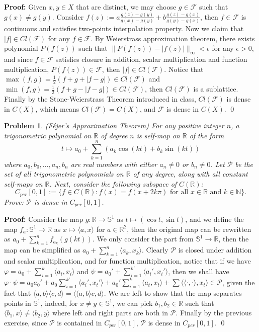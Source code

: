 \documentclass[12pt]{article}
\newtheorem{problem}{Problem}
\begin{document}
\textbf{Proof:} Given $x,y\in X$ that are distinct, we may choose $g\in\mathcal{F}$ such that $g(x)\neq g(y)$. Consider $f(z):=a\frac{g(z)-g(y)}{g(x)-g(y)}+b\frac{g(z)-g(x)}{g(y)-g(x)}$, then $f\in\mathcal{F}$ is continuous and satisfies two-points interpolation property. Now we claim that $|f|\in Cl(\mathcal{F})$ for any $f\in\mathcal{F}$. By Weierstrass approximation theorem, there exists polynomial $P(f(z))$ such that $\|P(f(z))-|f(z)|\|_\infty<\epsilon$ for any $\epsilon>0$, and since $f\in\mathcal{F}$ satisfies closure in addition, scalar multiplication and function multiplication, $P(f(z))\in\mathcal{F}$, then $|f|\in Cl(\mathcal{F})$. Notice that $\max(f,g)=\frac{1}{2}(f+g+|f-g|)\in Cl(\mathcal{F})$ and $\min(f, g)=\frac{1}{2}(f+g-|f-g|)\in Cl(\mathcal{F})$, then $Cl(\mathcal{F})$ is a sublattice. Finally by the Stone-Weierstrass Theorem introduced in class, $Cl(\mathcal{F})$ is dense in $C(X)$, which means $Cl(\mathcal{F})=C(X)$, and $\mathcal{F}$ is dense in $C(X)$. \qed
\\
\begin{problem}
(Féjer's Approximation Theorem) For any positive integer $n$, a trigonometric polynomial on $\mathbb{R}$ of degree $n$ is self-map on $\mathbb{R}$ of the form 
$$
t\mapsto a_0+\sum\limits_{k=1}^{n}(a_k\cos(kt)+b_k\sin(kt))
$$ where $a_0, b_0, \dots, a_n, b_n$ are real numbers with either $a_n\neq 0$ or $b_n\neq 0$. Let $\mathcal{P}$ be the set of all trigonometric polynomials on $\mathbb{R}$ of any degree, along with all constant self-maps on $\mathbb{R}$. Next, consider the following subspace of $C(\mathbb{R})$:
$$
C_{per}[0,1]:= \{f\in C(\mathbb{R}): f(x)=f(x+2k\pi)\text{ for all }x\in\mathbb{R}\text{ and }k\in\mathbb{N}\}.
$$ Prove: $\mathcal{P}$ is dense in $C_{per}[0,1]$.
\end{problem}
\textbf{Proof:} Consider the map $g:\mathbb{R}\to\mathbb{S}^1$ as $t\mapsto (\cos t, \sin t)$, and we define the map $f_a: \mathbb{S}^1\to\mathbb{R}$ as $x\mapsto\langle a, x\rangle$ for $a\in\mathbb{R}^2$, then the original map can be rewritten as $a_0+\sum\limits_{k=1}^{n}f_{a_k}(g(kt))$. We only consider the part from $\mathbb{S}^1\to\mathbb{R}$, then the map can be simplified as $a_0+\sum\limits_{k=1}^n\langle a_k, x_k\rangle$. Clearly $\mathcal{P}$ is closed under addition and scalar multiplication, and for function multiplication, notice that if we have $\varphi=a_0+\sum\limits_{i=1}^k\langle a_i, x_i\rangle$ and $\psi=a_0'+\sum\limits_{i=1}^{k'}\langle a_{i}', x_i'\rangle$, then we shall have $\varphi\cdot\psi=a_0a_0'+a_{0}\sum\limits_{i=1}^{k'}\langle a_i', x_t'\rangle + a_0'\sum\limits_{i=1}^{k}\langle a_t, x_t\rangle + \sum\limits\langle\langle\cdot, \cdot\rangle, x_t\rangle\in\mathcal{P}$, given the fact that $\langle a,b\rangle\langle c, d\rangle=\langle \langle a,b\rangle c, d\rangle$. We are left to show that the map separates points in $\mathbb{S}^1$, indeed, for $x\neq y\in\mathbb{S}^1$, we can pick $b_1, b_2\in\mathbb{R}$ such that $\langle b_1, x\rangle\neq \langle b_2, y\rangle$ where left and right parts are both in $\mathcal{P}$. Finally by the previous exercise, since $\mathcal{P}$ is contained in $C_{per}[0,1]$, $\mathcal{P}$ is dense in $C_{per}[0,1]$. \qed
\end{document}
